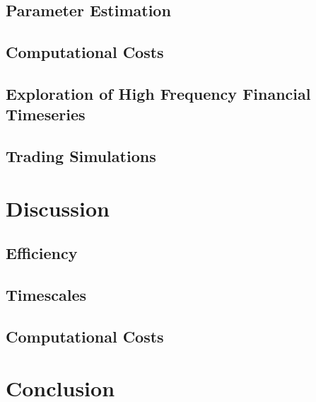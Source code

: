 \documentclass[12pt]{article}
\begin{document}
    \subsection{Parameter Estimation}
    
    \subsection{Computational Costs}
  
    
    \subsection{Exploration of High Frequency Financial Timeseries}
    
    
    \subsection{Trading Simulations}
    


\section{Discussion}

    \subsection{Efficiency}
    \subsection{Timescales}
    \subsection{Computational Costs}

\section{Conclusion}

	\printbibliography[title={References},heading=bibnumbered]
\end{document}
